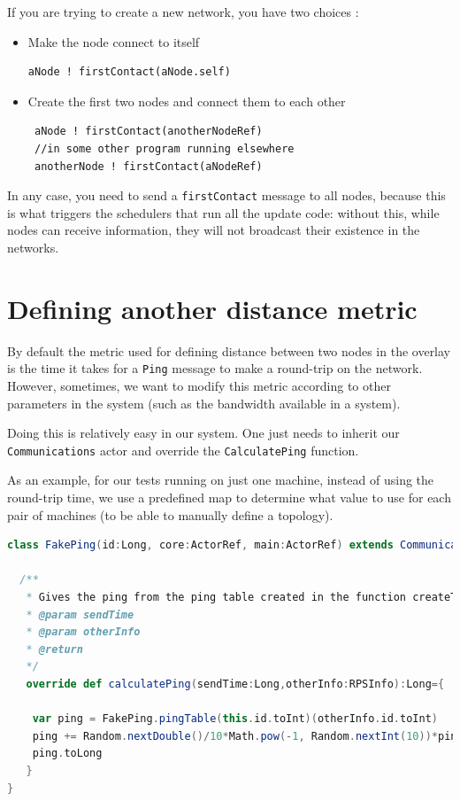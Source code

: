 \documentclass[11pt,a4paper]{article}
\begin{document}
 If you are trying to create a new network, you have two choices : 
 
 \begin{itemize}
    \item Make the node connect to itself 
    \begin{lstlisting}
aNode ! firstContact(aNode.self)
    \end{lstlisting}
 	\item Create the first two nodes and connect them to each other 
 	\begin{lstlisting}
 aNode ! firstContact(anotherNodeRef)
 //in some other program running elsewhere
 anotherNode ! firstContact(aNodeRef)
 	\end{lstlisting}
 \end{itemize}
 
 In any  case, you need to send a \verb|firstContact| message to all nodes, because this is what triggers the schedulers that run all the update code: without this, while nodes can receive information, they will not broadcast their existence in the networks.
 

\section{Defining another distance metric}

By default the metric used for defining distance between two nodes in the overlay is the time it takes for a \verb|Ping| message to make a round-trip on the network. However, sometimes, we want to modify this metric according to other parameters in the system (such as the bandwidth available in a system).

Doing this is relatively easy in our system. One just needs to inherit our \verb|Communications| actor and override the \verb|CalculatePing|  function.

As an example, for our tests running on just one machine, instead of using the round-trip time, we use a predefined map to determine what value to use for each pair of machines (to be able to manually define a topology).

\begin{lstlisting}[language=scala]
class FakePing(id:Long, core:ActorRef, main:ActorRef) extends Communication(id, core, main) {

  /**
   * Gives the ping from the ping table created in the function createTable
   * @param sendTime
   * @param otherInfo
   * @return
   */
   override def calculatePing(sendTime:Long,otherInfo:RPSInfo):Long={

    var ping = FakePing.pingTable(this.id.toInt)(otherInfo.id.toInt)
    ping += Random.nextDouble()/10*Math.pow(-1, Random.nextInt(10))*ping
    ping.toLong
   }
}
\end{lstlisting}
\end{document}
